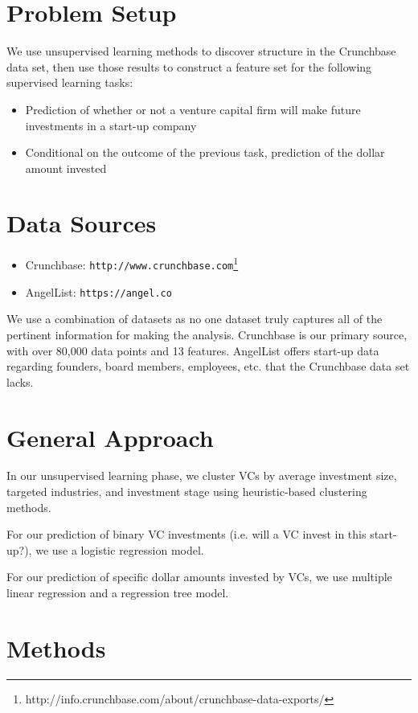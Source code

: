 \documentclass{article}
\begin{document}
\section{Problem Setup}
We use unsupervised learning methods to discover structure in the Crunchbase data set, then use those results to construct a feature set for the following supervised learning tasks:

\begin{itemize}
\item{Prediction of whether or not a venture capital firm will make future investments in a start-up company}
\item{Conditional on the outcome of the previous task, prediction of the dollar amount invested}
\end{itemize}

\section{Data Sources}

\begin{itemize}
\item{Crunchbase: \verb+http://www.crunchbase.com+\footnote{http://info.crunchbase.com/about/crunchbase-data-exports/}}
\item{AngelList: \verb+https://angel.co+\\}
\end{itemize}
We use a combination of datasets as no one dataset truly captures all of the pertinent information for making the analysis. Crunchbase is our primary source, with over 80,000 data points and 13 features. AngelList offers start-up data regarding founders, board members, employees, etc. that the Crunchbase data set lacks.

\section{General Approach}
In our unsupervised learning phase, we cluster VCs by average investment size, targeted industries, and investment stage using heuristic-based clustering methods.

For our prediction of binary VC investments (i.e. will a VC invest in this start-up?), we use a logistic regression model. 

For our prediction of specific dollar amounts invested by VCs, we use multiple linear regression and a regression tree model. 

\section{Methods}
\end{document}
